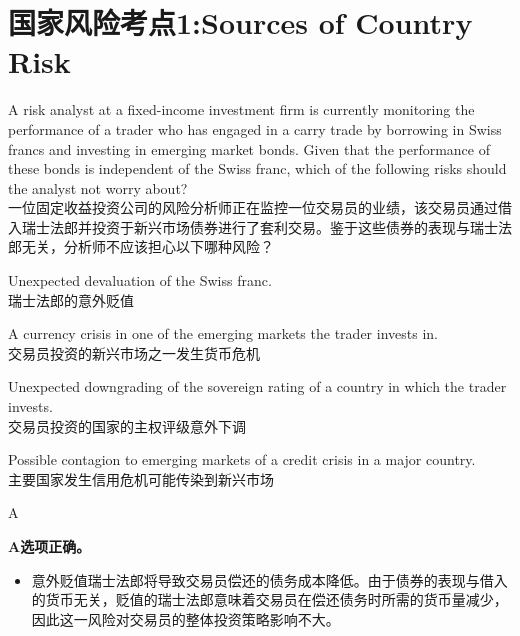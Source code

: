 \documentclass{article}
\newcounter{question} %
\begin{document}
 \tableofcontents %

\newpage


\iftrue
\section{国家风险考点1:Sources of Country Risk}
\setcounter{question}{0}


\begin{question}
    A risk analyst at a fixed-income investment firm is currently monitoring the performance of a trader who has engaged in a carry trade by borrowing in Swiss francs and investing in emerging market bonds. Given that the performance of these bonds is independent of the Swiss franc, which of the following risks should the analyst not worry about?\\
    一位固定收益投资公司的风险分析师正在监控一位交易员的业绩，该交易员通过借入瑞士法郎并投资于新兴市场债券进行了套利交易。鉴于这些债券的表现与瑞士法郎无关，分析师不应该担心以下哪种风险？
\end{question}
   
\begin{choices}
    \item Unexpected devaluation of the Swiss franc.\\ 
    瑞士法郎的意外贬值
    \item A currency crisis in one of the emerging markets the trader invests in.\\
    交易员投资的新兴市场之一发生货币危机
    \item Unexpected downgrading of the sovereign rating of a country in which the trader invests.\\ 
    交易员投资的国家的主权评级意外下调
    \item Possible contagion to emerging markets of a credit crisis in a major country.\\ 
    主要国家发生信用危机可能传染到新兴市场
\end{choices}
    
\begin{correctanswer}
   A
\end{correctanswer}
    
\textbf{A选项正确。} 
\begin{itemize}
    \item 意外贬值瑞士法郎将导致交易员偿还的债务成本降低。由于债券的表现与借入的货币无关，贬值的瑞士法郎意味着交易员在偿还债务时所需的货币量减少，因此这一风险对交易员的整体投资策略影响不大。
\end{itemize}
    
\end{document}
